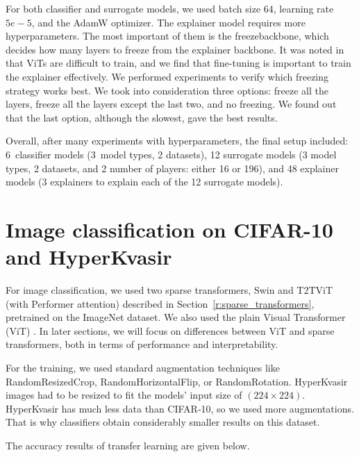 \documentclass[magisterska,en]{pracamgr}
\begin{document}
For both classifier and surrogate models, we used batch size $64$, learning rate $5e-5$, and the AdamW optimizer. The explainer model requires more hyperparameters. The most important of them is the freeze\textunderscore backbone, which decides how many layers to freeze from the explainer backbone. It was noted in \cite{DBLP:conf/iclr/Covert0L23} that ViTs are difficult to train, and we find that fine-tuning is important to train the explainer effectively. We performed experiments to verify which freezing strategy works best. We took into consideration three options: freeze all the layers, freeze all the layers except the last two, and no freezing. We found out that the last option, although the slowest, gave the best results.

Overall, after many experiments with hyperparameters, the final setup included: 6~classifier models (3~model types, 2 datasets), 12 surrogate models (3 model types, 2 datasets, and 2 number of players: either 16 or 196), and 48 explainer models (3 explainers to explain each of the 12 surrogate models).


\section{Image classification on CIFAR-10 and HyperKvasir}

For image classification, we used two sparse transformers, Swin and T2T\textunderscore ViT (with Performer attention) described in Section~\ref{r:sparse_transformers}, pretrained on the ImageNet dataset.
We also used the plain Visual Transformer (ViT) \cite{DBLP:conf/iclr/DosovitskiyB0WZ21}. In later sections, we will focus on differences between ViT and sparse transformers, both in terms of performance and interpretability.

For the training, we used standard augmentation techniques like RandomResizedCrop, RandomHorizontalFlip, or RandomRotation. HyperKvasir images had to be resized to fit the models' input size of $(224\times 224)$. HyperKvasir has much less data than CIFAR-10, so we used more augmentations. That is why classifiers obtain considerably smaller results on this dataset.

The accuracy results of transfer learning are given below.
\end{document}
